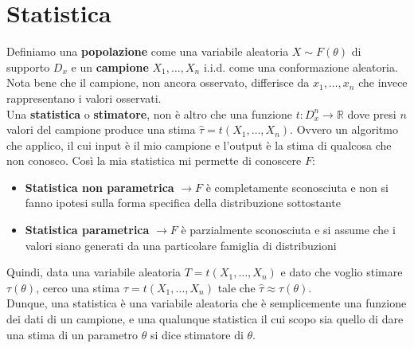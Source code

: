 \documentclass[11pt]{report}
\begin{document}
\section{Statistica}
Definiamo una \textbf{popolazione} come una variabile aleatoria $X \sim F(\theta)$ di supporto $D_x$ e un \textbf{campione} $X_1, \dots, X_n$ i.i.d. come una conformazione aleatoria. Nota bene che il campione, non ancora osservato, differisce da $x_1, \dots, x_n$ che invece rappresentano i valori osservati.\\
Una \textbf{statistica} o \textbf{stimatore}, non è altro che una funzione $t:D_x^n \rightarrow \mathbb{R}$ dove presi $n$ valori del campione produce una stima $\hat{\tau} = t(X_1, \dots, X_n)$. Ovvero un algoritmo che applico, il cui input è il mio campione e l'output è la stima di qualcosa che non conosco. Così la mia statistica mi permette di conoscere $F$:
\begin{itemize}
    \item \textbf{Statistica non parametrica} $\rightarrow F$ è completamente sconosciuta e non si fanno ipotesi sulla forma specifica della distribuzione sottostante
    \item \textbf{Statistica parametrica} $\rightarrow F$ è parzialmente sconosciuta e si assume che i valori siano generati da una particolare famiglia di distribuzioni
\end{itemize}
Quindi, data una variabile aleatoria $T = t(X_1, \dots, X_n)$ e dato che voglio stimare $\tau(\theta)$, cerco una stima $\hat{\tau} = t(X_1, \dots, X_n)$ tale che $\hat{\tau} \approx \tau(\theta)$.\\
Dunque, una statistica è una variabile aleatoria che è semplicemente una funzione dei dati di un campione, e una qualunque statistica il cui scopo sia quello di dare una stima di un parametro $\theta$ si dice stimatore di $\theta$.
\end{document}
